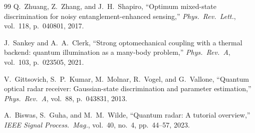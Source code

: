 \documentclass[journal]{IEEEtran}
\begin{document}
\begin{thebibliography}{99}
Q.~Zhuang, Z.~Zhang, and J.~H.~Shapiro, ``Optimum mixed-state discrimination for noisy entanglement-enhanced sensing,'' \textit{Phys.\ Rev.\ Lett.}, vol.~118, p.~040801, 2017.

J.~Sankey and A.~A.~Clerk, ``Strong optomechanical coupling with a thermal backend: quantum illumination as a many-body problem,'' \textit{Phys.\ Rev.\ A}, vol.~103, p.~023505, 2021.

V.~Gittsovich, S.~P.~Kumar, M.~Molnar, R.~Vogel, and G.~Vallone, ``Quantum optical radar receiver: Gaussian-state discrimination and parameter estimation,'' \textit{Phys.\ Rev.\ A}, vol.~88, p.~043831, 2013.

A.~Biswas, S.~Guha, and M.~M.~Wilde, ``Quantum radar: A tutorial overview,'' \textit{IEEE Signal Process.\ Mag.}, vol.~40, no.~4, pp.~44--57, 2023.

\end{thebibliography}
\end{document}
